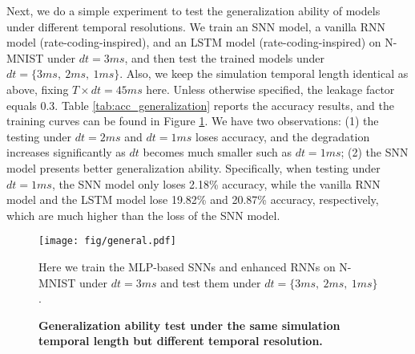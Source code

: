 \documentclass[journal,10pt,twocolumn]{IEEETran}
\begin{document}
\begin{table}[!htbp]
\caption{Accuracy results of generalization test under the same simulation temporal length but different temporal resolution.}
\label{tab:acc_generalization}
\vspace{2pt}
\centering
\renewcommand\arraystretch{1.3}
\end{table}


Next, we do a simple experiment to test the generalization ability of models under different temporal resolutions. We train an SNN model, a vanilla RNN model (rate-coding-inspired), and an LSTM model (rate-coding-inspired) on N-MNIST under $dt=3ms$, and then test the trained models under $dt=\{3ms,~2ms,~1ms\}$. Also, we keep the simulation temporal length identical as above, fixing $T\times dt=45ms$ here. Unless otherwise specified, the leakage factor equals 0.3. Table \ref{tab:acc_generalization} reports the accuracy results, and the training curves can be found in Figure \ref{fig:generalization}. We have two observations: (1) the testing under $dt=2ms$ and $dt=1ms$ loses accuracy, and the degradation increases significantly as $dt$ becomes much smaller such as $dt=1ms$; (2) the SNN model presents better generalization ability. Specifically, when testing under $dt=1ms$, the SNN model only loses 2.18\% accuracy, while the vanilla RNN model and the LSTM model lose 19.82\% and 20.87\% accuracy, respectively, which are much higher than the loss of the SNN model.

\begin{figure}[!htbp]
\centering     
\texttt{[image: fig/general.pdf]}
\caption{\textbf{Generalization ability test under the same simulation temporal length but different temporal resolution.}} Here we train the MLP-based SNNs and enhanced RNNs on N-MNIST under $dt=3ms$ and test them under $dt=\{3ms,~2ms,~1ms\}$. \label{fig:generalization} 
\end{figure}
\end{document}
